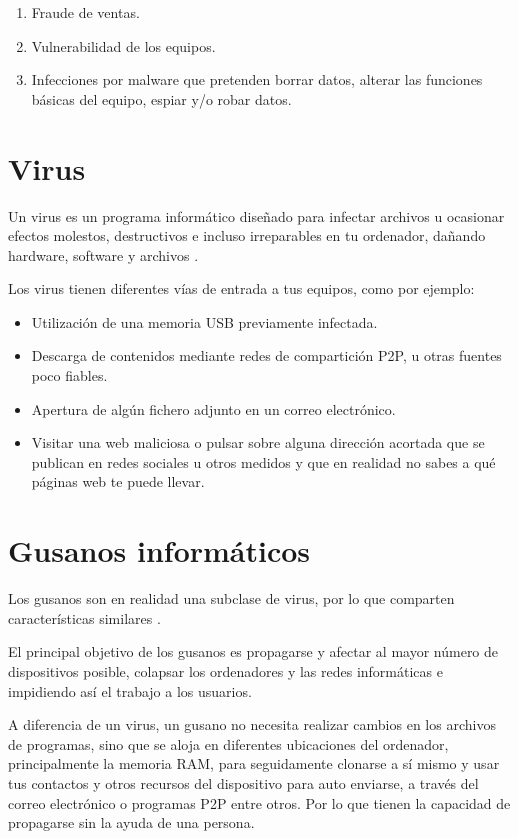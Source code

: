 \documentclass[
  spanish,
  a4paper,
  openany]{book}
\begin{document}
\begin{enumerate}
\def\labelenumi{\arabic{enumi}.}
\item
  Fraude de ventas.
\item
  Vulnerabilidad de los equipos.
\item
  Infecciones por malware que pretenden borrar datos, alterar las funciones básicas del equipo, espiar y/o robar datos.
\end{enumerate}

\hypertarget{virus}{%
\section{Virus}\label{virus}}

Un virus es un programa informático diseñado para infectar archivos u ocasionar efectos molestos, destructivos e incluso irreparables en tu ordenador, dañando hardware, software y archivos \citep{PANDA-virus}.

Los virus tienen diferentes vías de entrada a tus equipos, como por ejemplo:

\begin{itemize}
\item
  Utilización de una memoria USB previamente infectada.
\item
  Descarga de contenidos mediante redes de compartición P2P, u otras fuentes poco fiables.
\item
  Apertura de algún fichero adjunto en un correo electrónico.
\item
  Visitar una web maliciosa o pulsar sobre alguna dirección acortada que se publican en redes sociales u otros medidos y que en realidad no sabes a qué páginas web te puede llevar.
\end{itemize}

\hypertarget{gusanos-informuxe1ticos}{%
\section{Gusanos informáticos}\label{gusanos-informuxe1ticos}}

Los gusanos son en realidad una subclase de virus, por lo que comparten características similares \citep{PANDA-gusano}.

El principal objetivo de los gusanos es propagarse y afectar al mayor número de dispositivos posible, colapsar los ordenadores y las redes informáticas e impidiendo así el trabajo a los usuarios.

A diferencia de un virus, un gusano no necesita realizar cambios en los archivos de programas, sino que se aloja en diferentes ubicaciones del ordenador, principalmente la memoria RAM, para seguidamente clonarse a sí mismo y usar tus contactos y otros recursos del dispositivo para auto enviarse, a través del correo electrónico o programas P2P entre otros. Por lo que tienen la capacidad de propagarse sin la ayuda de una persona.
\end{document}
